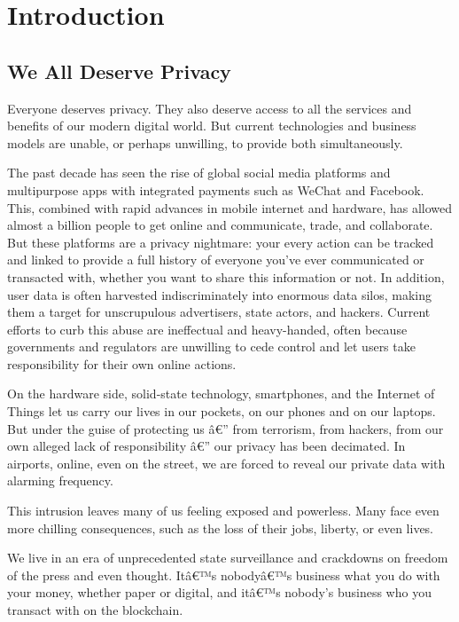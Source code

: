 \documentclass[8pt,fleqn,openany]{book}
\begin{document}
\chapter{Introduction}\label{chap:intro}

\section{We All Deserve Privacy}
Everyone deserves privacy. They also deserve access to all the services and benefits of our modern digital world. But current technologies and business models are unable, or perhaps unwilling, to provide both simultaneously.

The past decade has seen the rise of global social media platforms and multipurpose apps with integrated payments such as WeChat and Facebook. This, combined with rapid advances in mobile internet and hardware, has allowed almost a billion people to get online and communicate, trade, and collaborate. But these platforms are a privacy nightmare: your every action can be tracked and linked to provide a full history of everyone you've ever communicated or transacted with, whether you want to share this information or not. In addition, user data is often harvested indiscriminately into enormous data silos, making them a target for unscrupulous advertisers, state actors, and hackers. Current efforts to curb this abuse are ineffectual and heavy-handed, often because governments and regulators are unwilling to cede control and let users take responsibility for their own online actions.

On the hardware side, solid-state technology, smartphones, and the Internet of Things let us carry our lives in our pockets, on our phones and on our laptops. But under the guise of protecting us â€” from terrorism, from hackers, from our own alleged lack of responsibility â€” our privacy has been decimated. In airports, online, even on the street, we are forced to reveal our private data with alarming frequency.

This intrusion leaves many of us feeling exposed and powerless. Many face even more chilling consequences, such as the loss of their jobs, liberty, or even lives. 

We live in an era of unprecedented state surveillance and crackdowns on freedom of the press and even thought. Itâ€™s nobodyâ€™s business what you do with your money, whether paper or digital, and itâ€™s nobody's business who you transact with on the blockchain.
\end{document}
